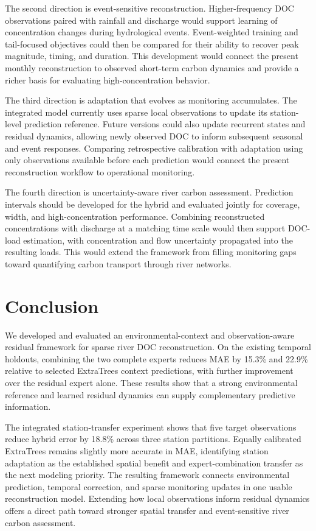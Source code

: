 \documentclass[11pt]{article}
\begin{document}
The second direction is event-sensitive reconstruction. Higher-frequency DOC observations paired with rainfall and discharge would support learning of concentration changes during hydrological events. Event-weighted training and tail-focused objectives could then be compared for their ability to recover peak magnitude, timing, and duration. This development would connect the present monthly reconstruction to observed short-term carbon dynamics and provide a richer basis for evaluating high-concentration behavior.

The third direction is adaptation that evolves as monitoring accumulates. The integrated model currently uses sparse local observations to update its station-level prediction reference. Future versions could also update recurrent states and residual dynamics, allowing newly observed DOC to inform subsequent seasonal and event responses. Comparing retrospective calibration with adaptation using only observations available before each prediction would connect the present reconstruction workflow to operational monitoring.

The fourth direction is uncertainty-aware river carbon assessment. Prediction intervals should be developed for the hybrid and evaluated jointly for coverage, width, and high-concentration performance. Combining reconstructed concentrations with discharge at a matching time scale would then support DOC-load estimation, with concentration and flow uncertainty propagated into the resulting loads. This would extend the framework from filling monitoring gaps toward quantifying carbon transport through river networks.

\section{Conclusion}
We developed and evaluated an environmental-context and observation-aware residual framework for sparse river DOC reconstruction. On the existing temporal holdouts, combining the two complete experts reduces MAE by 15.3\% and 22.9\% relative to selected ExtraTrees context predictions, with further improvement over the residual expert alone. These results show that a strong environmental reference and learned residual dynamics can supply complementary predictive information.

The integrated station-transfer experiment shows that five target observations reduce hybrid error by 18.8\% across three station partitions. Equally calibrated ExtraTrees remains slightly more accurate in MAE, identifying station adaptation as the established spatial benefit and expert-combination transfer as the next modeling priority. The resulting framework connects environmental prediction, temporal correction, and sparse monitoring updates in one usable reconstruction model. Extending how local observations inform residual dynamics offers a direct path toward stronger spatial transfer and event-sensitive river carbon assessment.
\end{document}
